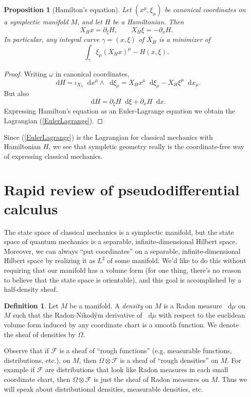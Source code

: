 \documentclass[reqno,12pt,letterpaper]{amsart}
\newcommand*\dif{\mathop{}\!\mathrm{d}}
\newcommand{\dfn}[1]{\emph{#1}\index{#1}}
\newtheorem{proposition}[theorem]{Proposition}
\theoremstyle{definition}
\newtheorem{definition}[theorem]{Definition}
\numberwithin{equation}{section}
\begin{document}
\begin{proposition}[Hamilton's equation]
Let $(x^\mu, \xi_\mu)$ be canonical coordinates on a symplectic manifold $M$, and let $H$ be a Hamiltonian.
Then 
$$X_H x = \partial_\xi H, \qquad X_H \xi = -\partial_x H.$$
In particular, any integral curve $\gamma = (x, \xi)$ of $X_H$ is a minimizer of
\begin{equation}\label{EulerLagrange}
\int_\gamma \xi_\mu (X_H x)^\mu - H(x, \xi).
\end{equation}
\end{proposition}
\begin{proof}
Writing $\omega$ in canonical coordinates,
$$\dif H = \iota_{X_h} \dif x^\mu \wedge \dif \xi_\mu = X_H x^\mu \dif \xi_\mu - X_H \xi^\mu \dif x_\mu.$$
But also 
$$\dif H = \partial_\xi H \dif \xi + \partial_x H \dif x.$$
Expressing Hamilton's equation as an Euler-Lagrange equation we obtain the Lagrangian (\ref{EulerLagrange}).
\end{proof}

Since (\ref{EulerLagrange}) is the Lagrangian for classical mechanics with Hamiltonian $H$, we see that sympletic geometry really is the coordinate-free way of expressing classical mechanics.

\section{Rapid review of pseudodifferential calculus}
The state space of classical mechanics is a symplectic manifold, but the state space of quantum mechanics is a separable, infinite-dimensional Hilbert space.
Moreover, we can always ``put coordinates'' on a separable, infinite-dimensional Hilbert space by realizing it as $L^2$ of some manifold.
We'd like to do this without requiring that our manifold has a volume form (for one thing, there's no reason to believe that the state space is orientable), and this goal is accomplished by a half-density sheaf.

\begin{definition}
Let $M$ be a manifold. A \dfn{density} on $M$ is a Radon measure $\dif \mu$ on $M$ such that the Radon-Nikod\'ym derivative of $\dif \mu$ with respect to the euclidean volume form induced by any coordinate chart is a smooth function.
We denote the sheaf of densities by $\Omega$.
\end{definition}

Observe that if $\mathcal F$ is a sheaf of ``rough functions'' (e.g. measurable functions, distributions, etc.), on $M$, then $\Omega \otimes \mathcal F$ is a sheaf of ``rough densities'' on $M$.
For example if $\mathcal F$ are distributions that look like Radon measures in each small coordinate chart, then $\Omega \otimes \mathcal F$ is just the sheaf of Radon measures on $M$.
Thus we will speak about distributional densities, measurable densities, etc.
\end{document}
